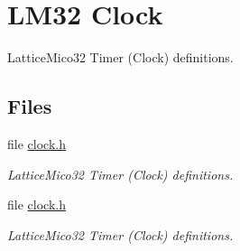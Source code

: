 \hypertarget{group__lm32__clock}{}\section{L\+M32 Clock}
\label{group__lm32__clock}


Lattice\+Mico32 Timer (Clock) definitions.  


\subsection*{Files}
\begin{DoxyCompactItemize}
\item 
file \mbox{\hyperlink{bsps_2lm32_2shared_2clock_2clock_8h}{clock.\+h}}
\begin{DoxyCompactList}\small\item\em Lattice\+Mico32 Timer (Clock) definitions. \end{DoxyCompactList}\item 
file \mbox{\hyperlink{bsps_2lm32_2shared_2milkymist__clock_2clock_8h}{clock.\+h}}
\begin{DoxyCompactList}\small\item\em Lattice\+Mico32 Timer (Clock) definitions. \end{DoxyCompactList}\end{DoxyCompactItemize}
